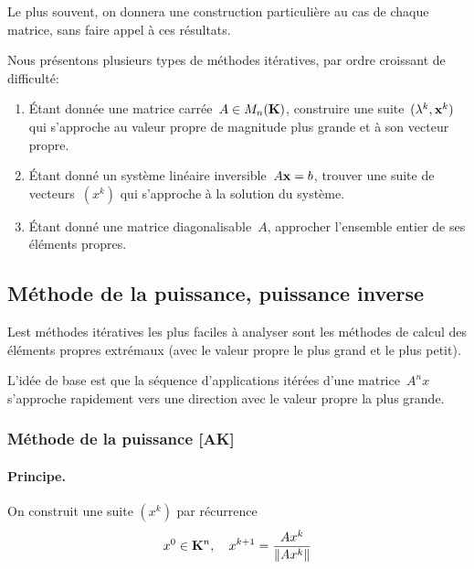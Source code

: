 Le plus souvent, on donnera une construction particulière au cas de chaque
matrice, sans faire appel à ces résultats.


Nous présentons plusieurs types de méthodes itératives, par ordre croissant de
difficulté:
\begin{enumerate}
	\item Étant donnée une matrice carrée~$A\in M_n(\mathbf{K})$, construire une
		suite~$(\lambda^k,\mathbf{x}^k)$ qui s'approche au valeur propre de magnitude
		plus grande et à son vecteur propre.
	\item Étant donné un système linéaire inversible~$A\mathbf{x}=b$, trouver une
		suite de vecteurs~$(x^k)$ qui s'approche à la solution du système.
	\item Étant donné une matrice diagonalisable~$A$, approcher l'ensemble
		entier de ses éléments propres.
\end{enumerate}


\subsection{Méthode de la puissance, puissance inverse}

Lest méthodes itératives les plus faciles à analyser sont les méthodes de
calcul des éléments propres extrémaux (avec le valeur propre le plus grand et
le plus petit).

L'idée de base est que la séquence d'applications itérées d'une
matrice~$A^nx$ s'approche rapidement vers une direction avec le valeur
propre la plus grande.

\subsubsection{Méthode de la puissance [AK]}
\paragraph*{Principe.} On construit une suite $(x^k)$ par récurrence
\[
x^0 \in \mathbf{K}^n, \quad x^{k+1} = \frac{Ax^k}{{\left\|Ax^k\right\|}}
\]

